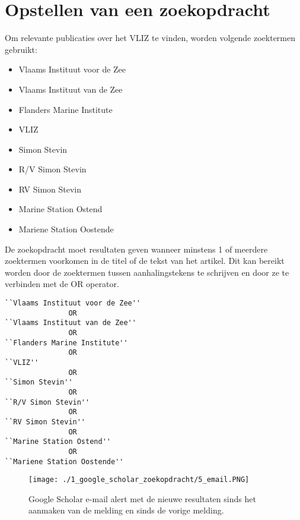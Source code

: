 \section{Opstellen van een zoekopdracht}
Om relevante publicaties over het VLIZ te vinden, worden volgende zoektermen gebruikt:
\begin{itemize}
    \item Vlaams Instituut voor de Zee
    \item Vlaams Instituut van de Zee
    \item Flanders Marine Institute
    \item VLIZ
    \item Simon Stevin
    \item R/V Simon Stevin
    \item RV Simon Stevin
    \item Marine Station Ostend
    \item Mariene Station Oostende
\end{itemize}
De zoekopdracht moet resultaten geven wanneer minstens 1 of meerdere zoektermen voorkomen in de titel of de tekst van het artikel. Dit kan bereikt worden door de zoektermen tussen aanhalingstekens te schrijven en door ze te verbinden met de OR operator.
\linebreak
\begin{lstlisting}
``Vlaams Instituut voor de Zee'' 
               OR 
``Vlaams Instituut van de Zee'' 
               OR 
``Flanders Marine Institute'' 
               OR 
``VLIZ'' 
               OR 
``Simon Stevin'' 
               OR 
``R/V Simon Stevin'' 
               OR 
``RV Simon Stevin'' 
               OR 
``Marine Station Ostend'' 
               OR 
``Mariene Station Oostende''
\end{lstlisting}

\begin{figure}
    \centering
    \texttt{[image: ./1\_google\_scholar\_zoekopdracht/5\_email.PNG]}
    \caption[Google Scholar email alert.]{\label{fig:Google Scholar email alert}Google Scholar e-mail alert met de nieuwe resultaten sinds het aanmaken van de melding en sinds de vorige melding.}
\end{figure}


